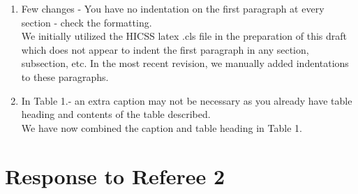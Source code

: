 \documentclass{amsart}[12pt]
\begin{document}
\begin{enumerate}
        \hspace{10pt}
    \item   {\color{blue}
        Few changes - You have no indentation on the first paragraph at every section - check the formatting. 
        }\\

        We initially utilized the HICSS latex .cls file in the preparation of this draft which does not appear 
        to indent the first paragraph in any section, subsection, etc. In the most recent revision, 
        we manually added indentations to these paragraphs.

        \hspace{10pt}
    \item   {\color{blue}
        In Table 1.- an extra caption may not be necessary as you already have table heading and contents of the table described. 
        }\\

        We have now combined the caption and table heading in Table 1.

\end{enumerate}

\section{Response to Referee 2}
\end{document}
